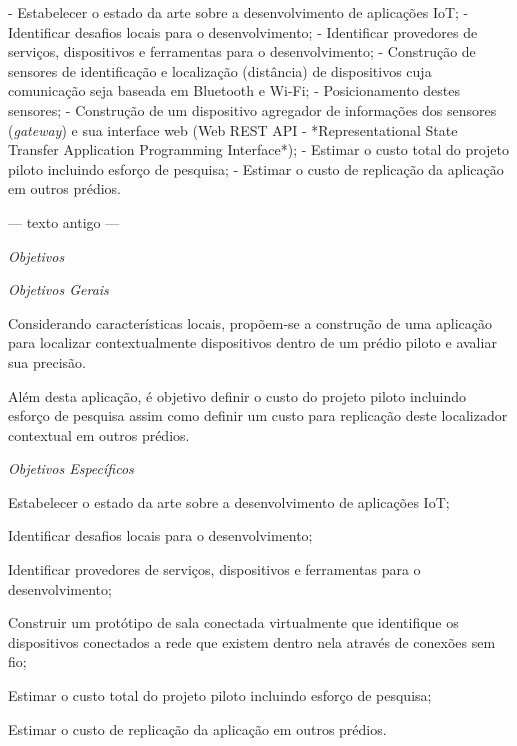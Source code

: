 \documentclass[
	12pt,				%
	openright,			%
	oneside,			%
	a4paper,			%
	chapter=TITLE,		%
	english,			%
	french,				%
	spanish,			%
	brazil				%
	]{abntex2}
\begin{document}
{-  Estabelecer o estado da arte sobre a desenvolvimento de aplicações IoT;
-  Identificar desafios locais para o desenvolvimento;
-  Identificar provedores de serviços, dispositivos e ferramentas para o
desenvolvimento;
- Construção de sensores de identificação e localização (distância) de
 dispositivos cuja comunicação seja baseada em Bluetooth e Wi-Fi;
- Posicionamento destes sensores;
- Construção de um dispositivo agregador de informações dos sensores
 (\textit{gateway}) e sua interface web (Web REST API - *Representational
State Transfer Application Programming Interface*);
-  Estimar o custo total do projeto piloto incluindo esforço de pesquisa;
-  Estimar o custo de replicação da aplicação em outros prédios.

--- texto antigo ---

\textit{Objetivos}

\textit{Objetivos Gerais}

Considerando características locais, propõem-se a construção de uma aplicação
para localizar contextualmente dispositivos dentro de um prédio piloto e avaliar
sua precisão.

Além desta aplicação, é objetivo definir o custo do projeto piloto incluindo
esforço de pesquisa assim como definir um custo para replicação deste
localizador contextual em outros prédios.

\textit{Objetivos Específicos}

\begin{alineas}

	\item Estabelecer o estado da arte sobre a desenvolvimento de aplicações IoT;

	\item Identificar desafios locais para o desenvolvimento;

	\item Identificar provedores de serviços, dispositivos e ferramentas para o
	desenvolvimento;

	\item Construir um protótipo de sala conectada virtualmente que identifique
	os dispositivos conectados a rede que existem dentro nela através de
	conexões sem fio;

	\item Estimar o custo total do projeto piloto incluindo esforço de pesquisa;

	\item Estimar o custo de replicação da aplicação em outros prédios.


\end{alineas}}
\end{document}
